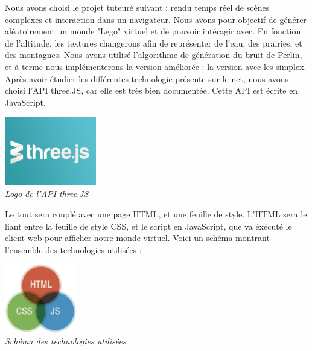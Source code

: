 Nous avons choisi le projet tuteuré suivant : rendu temps réel de scènes complexes et interaction dans un navigateur.
Nous avons pour objectif de générer aléatoirement un monde "Lego" virtuel et de pouvoir intéragir avec. En fonction de
l'altitude, les textures changerons afin de représenter de l'eau, des prairies, et des montagnes. Nous avons utilisé
l'algorithme de génération du bruit de Perlin, et à terme nous implémenterons la version améliorée : la version avec les simplex.
Après avoir étudier les différentes technologie présente sur le net, nous avons choisi l'API three.JS, car elle est très bien
documentée. Cette API est écrite en JavaScript.

\begin{center}
	\null\vspace{0.25cm}
	\includegraphics[height=3cm]{images/logo_threeJS.png}\\
	\textit{Logo de l'API three.JS}\\
\end{center}

Le tout sera couplé avec une page HTML, et une feuille de style. L'HTML sera le liant entre la feuille de style CSS, et le script en JavaScript, que va éxécuté le client web pour afficher notre monde virtuel.
Voici un schéma montrant l'ensemble des technologies utilisées :

\begin{center}
	\null\vspace{0.25cm}
	\includegraphics[height=3cm]{images/HTML_CSS_JS.png}\\
	\textit{Schéma des technologies utilisées}\\
\end{center}

